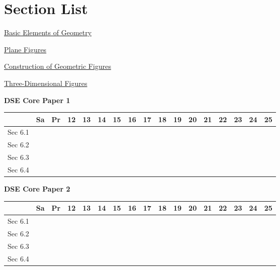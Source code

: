 \documentclass[12pt, a4paper]{article}
\begin{document}
\section*{Section List}
\begin{enumx}[label=Sec 6.\arabic*\ ]
\item \hyperref[section:1-6-1]{Basic Elements of Geometry}
\item \hyperref[section:1-6-2]{Plane Figures}
\item \hyperref[section:1-6-3]{Construction of Geometric Figures}
\item \hyperref[section:1-6-4]{Three-Dimensional Figures}
\end{enumx}
\begin{absolutelynopagebreak}
\begin{center}
\textbf{DSE Core Paper 1}
\end{center}
\begin{center}
\begin{tabular}{|l|c|c|c|c|c|c|c|c|c|c|c|c|c|c|c|c|}
\hline
        & Sa & Pr & 12 & 13 & 14 & 15 & 16 & 17 & 18 & 19 & 20 & 21 & 22 & 23 & 24 & 25 \\\hline\hline
Sec 6.1 &  &  &  &  &  &  &  &  &  &  &  &  &  &  &  &  \\\hline
Sec 6.2 &  &  &  &  &  &  &  &  &  &  &  &  &  &  &  &  \\\hline
Sec 6.3 &  &  &  &  &  &  &  &  &  &  &  &  &  &  &  &  \\\hline
Sec 6.4 &  &  &  &  &  &  &  &  &  &  &  &  &  &  &  &  \\\hline
\end{tabular}
\end{center}
\end{absolutelynopagebreak}
\begin{absolutelynopagebreak}
\begin{center}
\textbf{DSE Core Paper 2}
\end{center}
\begin{center}
\begin{tabular}{|l|c|c|c|c|c|c|c|c|c|c|c|c|c|c|c|c|}
\hline
        & Sa & Pr & 12 & 13 & 14 & 15 & 16 & 17 & 18 & 19 & 20 & 21 & 22 & 23 & 24 & 25 \\\hline\hline
Sec 6.1 &  &  &  &  &  &  &  &  &  &  &  &  &  &  &  &  \\\hline
Sec 6.2 &  &  &  &  &  &  &  &  &  &  &  &  &  &  &  &  \\\hline
Sec 6.3 &  &  &  &  &  &  &  &  &  &  &  &  &  &  &  &  \\\hline
Sec 6.4 &  &  &  &  &  &  &  &  &  &  &  &  &  &  &  &  \\\hline
\end{tabular}
\end{center}
\end{absolutelynopagebreak}
\end{document}
